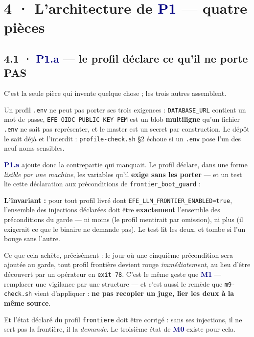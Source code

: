 \documentclass[10pt]{article}
\newcommand{\code}[1]{\texttt{\small #1}}
\newcommand{\mm}[1]{\textbf{\textcolor{navy}{#1}}}
\begin{document}
\section{4 · L'architecture de \mm{P1} --- quatre pièces}

\subsection{4.1 · \mm{P1.a} --- le profil déclare ce qu'il ne porte PAS}

C'est la seule pièce qui invente quelque chose ; les trois autres assemblent.

Un profil \code{.env} ne peut pas porter ses trois exigences : \code{DATABASE\_URL} contient un mot
de passe, \code{EFE\_OIDC\_PUBLIC\_KEY\_PEM} est un blob \textbf{multiligne} qu'un fichier
\code{.env} ne sait pas représenter, et le master est un secret par construction. Le dépôt le sait
déjà et l'interdit : \code{profile-check.sh} \S2 échoue si un \code{.env} pose l'un des neuf noms
sensibles.

\mm{P1.a} ajoute donc la contrepartie qui manquait. Le profil déclare, dans une forme
\emph{lisible par une machine}, les variables qu'il \textbf{exige sans les porter} --- et un test
lie cette déclaration aux préconditions de \code{frontier\_boot\_guard} :

\begin{extrait}\small
\textbf{L'invariant :} pour tout profil livré dont \code{EFE\_LLM\_FRONTIER\_ENABLED=true},
l'ensemble des injections déclarées doit être \textbf{exactement} l'ensemble des préconditions du
garde --- ni moins (le profil mentirait par omission), ni plus (il exigerait ce que le binaire ne
demande pas). Le test lit les deux, et tombe si l'un bouge sans l'autre.
\end{extrait}

Ce que cela achète, précisément : le jour où une cinquième précondition sera ajoutée au garde, tout
profil frontière devient rouge \emph{immédiatement}, au lieu d'être découvert par un opérateur en
\code{exit 78}. C'est le même geste que \mm{M1} --- remplacer une vigilance par une structure --- et
c'est aussi le remède que \code{m9-check.sh} vient d'appliquer : \textbf{ne pas recopier un juge,
lier les deux à la même source}.

Et l'état déclaré du profil \code{frontiere} doit être corrigé : sans ses injections, il ne sert pas
la frontière, il la \emph{demande}. Le troisième état de \mm{M0} existe pour cela.
\end{document}

